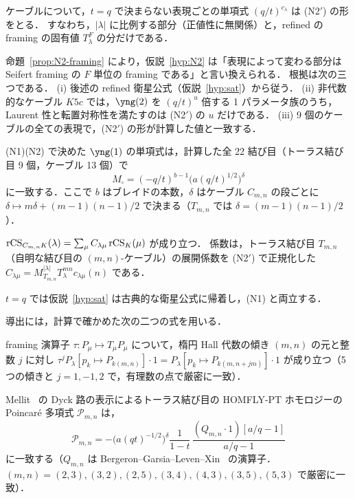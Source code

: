 \begin{hypothesis}\label{hyp:N2}
ケーブルについて，$t=q$ で決まらない表現ごとの単項式 $(q/t)^{c_\lambda}$ は (N2$'$) の形をとる．
すなわち，$|\lambda|$ に比例する部分（正値性に無関係）と，refined の framing の固有値 $T_\lambda^F$ の分だけである．
\end{hypothesis}
命題~\ref{prop:N2-framing} により，仮説~\ref{hyp:N2} は「表現によって変わる部分は Seifert framing の $F$ 単位の framing である」と言い換えられる．
根拠は次の三つである．
(i) 後述の refined 衛星公式（仮説~\ref{hyp:sat}）から従う．
(ii) 非代数的なケーブル $K5c$ では，$\yng(2)$ を $(q/t)^u$ 倍する 1 パラメータ族のうち，Laurent 性と転置対称性を満たすのは (N2$'$) の $u$ だけである．
(iii) 9 個のケーブルの全ての表現で，(N2$'$) の形が計算した値と一致する．

\begin{compresult}\label{cr:M}
(N1)(N2) で決めた $\yng(1)$ の単項式は，計算した全 22 結び目（トーラス結び目 9 個，ケーブル 13 個）で
\[
M_\square=(-q/t)^{b-1}\bigl(a(q/t)^{1/2}\bigr)^{\delta}
\]
に一致する．ここで $b$ はブレイドの本数，$\delta$ はケーブル $C_{m,n}$ の段ごとに $\delta\mapsto m\delta+(m-1)(n-1)/2$ で決まる（$T_{m,n}$ では $\delta=(m-1)(n-1)/2$）．
\end{compresult}

\begin{hypothesis}\label{hyp:sat}
$\textrm{rCS}_{C_{m,n}K}(\lambda)=\sum_\mu C_{\lambda\mu}\,\textrm{rCS}_K(\mu)$ が成り立つ．
係数は，トーラス結び目 $T_{m,n}$（自明な結び目の $(m,n)$-ケーブル）の展開係数を (N2$'$) で正規化した $C_{\lambda\mu}=M_{T_{m,n}}^{|\lambda|}T_\lambda^{mn}c_{\lambda\mu}(n)$ である．
\end{hypothesis}
$t=q$ では仮説~\ref{hyp:sat} は古典的な衛星公式に帰着し，(N1) と両立する．

導出には，計算で確かめた次の二つの式を用いる．
\begin{compresult}\label{cr:tau}
framing 演算子 $\tau:P_\mu\mapsto T_\mu P_\mu$ について，楕円 Hall 代数の傾き $(m,n)$ の元と整数 $j$ に対し
$\tau^jP_\lambda[p_k\mapsto P_{k(m,n)}]\cdot1=P_\lambda[p_k\mapsto P_{k(m,n+jm)}]\cdot1$ が成り立つ（5 つの傾きと $j=1,-1,2$ で，有理数の点で厳密に一致）．
\end{compresult}
\begin{compresult}\label{cr:mellit}
Mellit~\cite[Thm.~3.1]{Mellit17} の Dyck 路の表示によるトーラス結び目の HOMFLY-PT ホモロジーの Poincaré 多項式 $\mathcal{P}_{m,n}$ は，
\[
\mathcal{P}_{m,n}=-\bigl(a(qt)^{-1/2}\bigr)^{\delta}\frac{1}{1-t}\,\frac{(Q_{m,n}\cdot1)[a/q-1]}{a/q-1}
\]
に一致する（$Q_{m,n}$ は Bergeron--Garsia--Leven--Xin~\cite{Bergeron14} の演算子．$(m,n)=(2,3),(3,2),(2,5),(3,4),(4,3),(3,5),(5,3)$ で厳密に一致）．
\end{compresult}

